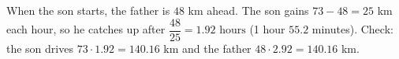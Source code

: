 When the son starts, the father is $48$ km ahead. The son gains $73-48=25$ km each hour, so he catches up after $\dfrac{48}{25}=\boxed{1.92\text{ hours}}$ (1 hour $55.2$ minutes). Check: the son drives $73\cdot1.92=140.16$ km and the father $48\cdot2.92=140.16$ km.
